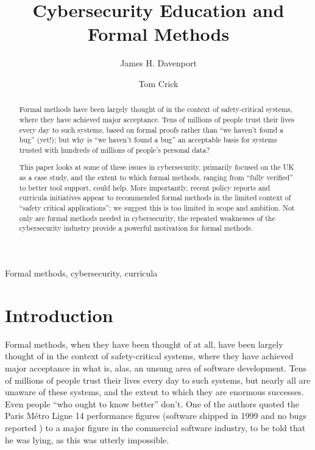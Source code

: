\documentclass{llncs}
\begin{document}
\title{Cybersecurity Education and Formal Methods}

\author{James H. Davenport \and Tom Crick}


\maketitle

\begin{abstract}
Formal methods have been largely thought of in the context of safety-critical systems, where they have achieved major acceptance. Tens of millions of people trust their lives every day to such systems, based on formal proofs rather than ``we haven't found a bug'' (yet!); but why is ``we haven't found a bug'' an acceptable basis for systems trusted with hundreds of millions of people's personal data?

This paper looks at some of these issues in cybersecurity, primarily focused on the UK as a case study, and the extent to which formal methods, ranging from ``fully verified'' to better tool support, could help. More importantly, recent policy reports and curricula initiatives appear to recommended formal methods in the limited context of ``safety critical applications''; we suggest this is too limited in scope and ambition. Not only are formal methods needed in cybersecurity, the repeated weaknesses of the cybersecurity industry provide a powerful motivation for formal methods.
\end{abstract}

\begin{keywords}
Formal methods, cybersecurity, curricula
\end{keywords}

\section{Introduction}
Formal methods, when they have been thought of at all, have been largely thought of in the context of safety-critical systems, where they have achieved major acceptance in what is, alas, an unsung area of software development.  Tens of millions of people trust their lives every day to such systems, but nearly all are unaware of these systems, and the extent to which they are enormous successes. Even people ``who ought to know better'' don't. One of the authors quoted the Paris M\'etro Ligne 14 performance figures (software shipped in 1999 and no bugs reported \cite{jacquel2011verifying}) to a major figure in the commercial software industry, to be told that he was lying, as this was utterly impossible.
\end{document}
